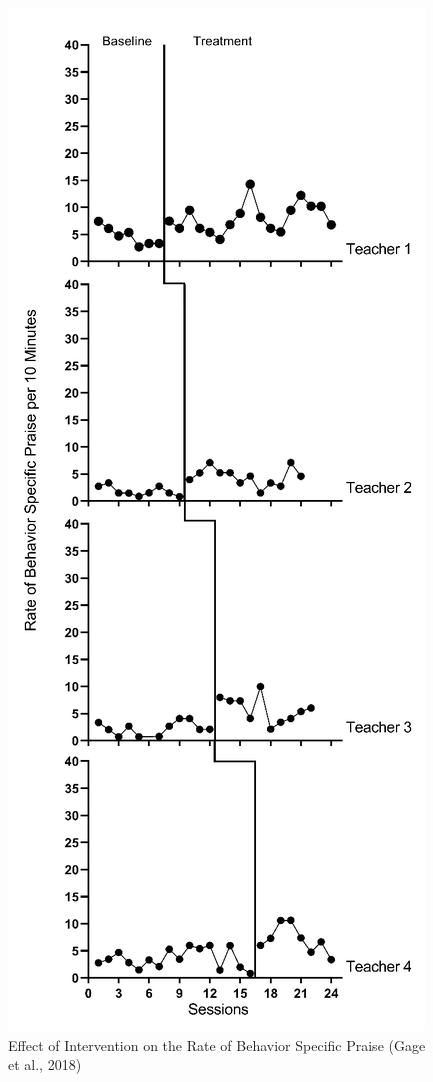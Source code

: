 \documentclass[
]{book}
\begin{document}
\begin{figure}
\includegraphics[width=0.6\linewidth]{images/Gage2018} \caption{Effect of Intervention on the Rate of Behavior Specific Praise (Gage et al., 2018)}\label{fig:Gage-raw-2018}
\end{figure}
\end{document}
